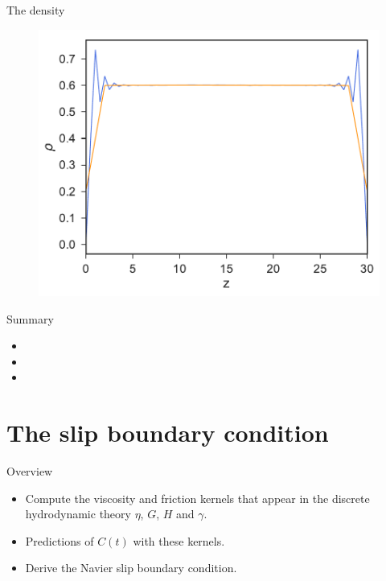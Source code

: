 \documentclass{beamer}
\begin{document}
\begin{frame}{The density}
\begin{figure}[h!]
\includegraphics[scale=0.41]{DensityProfile-WALLS}
\end{figure}
\end{frame}

\begin{frame}{Summary}
  \begin{itemize}
    \item
    \item
    \item 
   \end{itemize}
\end{frame}

\section{The slip boundary condition}
\begin{frame}{Overview}
  \begin{itemize}
    \item Compute the viscosity and friction kernels that appear in the discrete hydrodynamic theory $\eta$, $G$, $H$ and $\gamma$.
    \item Predictions of $C(t)$ with these kernels. 
    \item Derive the Navier slip boundary condition.
      \

    \end{itemize}

\end{frame}
\end{document}
